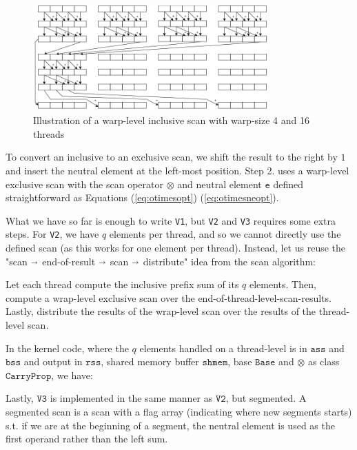 \begin{figure}
  \centering
  \includegraphics[width=0.8\textwidth]{img/warp-level-scan.png}
  \caption{Illustration of a warp-level inclusive scan with warp-size 4 and 16 threads}
  \label{fig:warpscan}
\end{figure}

To convert an inclusive to an exclusive scan, we shift the result to the right
by $1$ and insert the neutral element at the left-most position. Step 2. uses a
warp-level exclusive scan with the scan operator $\otimes$ and neutral element
$\mathtt{e}$ defined straightforward as Equations (\ref{eq:otimesopt})
(\ref{eq:otimesneopt}).

What we have so far is enough to write \texttt{V1}, but \texttt{V2} and
\texttt{V3} requires some extra steps. For \texttt{V2}, we have $q$ elements per
thread, and so we cannot directly use the defined scan (as this works for one
element per thread). Instead, let us reuse the "scan $\shortrightarrow$
end-of-result $\shortrightarrow$ scan $\shortrightarrow$ distribute" idea from
the scan algorithm:

Let each thread compute the inclusive prefix sum of its $q$ elements. Then,
compute a wrap-level exclusive scan over the
end-of-thread-level-scan-results. Lastly, distribute the results of the
wrap-level scan over the results of the thread-level scan.

In the kernel code, where the $q$ elements handled on a thread-level is in
$\mathtt{ass}$ and $\mathtt{bss}$ and output in $\mathtt{rss}$, shared memory
buffer $\mathtt{shmem}$, base $\mathtt{Base}$ and $\otimes$ as class
$\mathtt{CarryProp}$, we have:



Lastly, $\mathtt{V3}$ is implemented in the same manner as $\mathtt{V2}$, but
segmented. A segmented scan is a scan with a flag array (indicating where new
segments starts) s.t. if we are at the beginning of a segment, the neutral
element is used as the first operand rather than the left sum.

